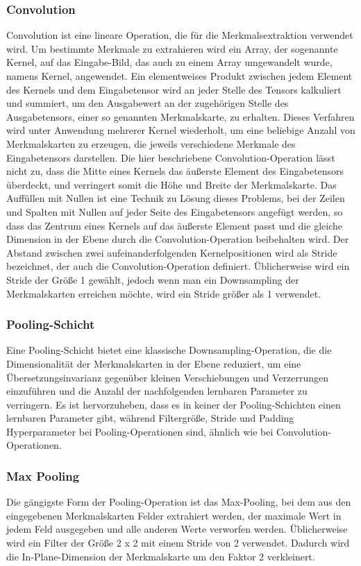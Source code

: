 \documentclass[paper=A4,pagesize=auto,12pt,headinclude=true,footinclude=true,BCOR=0mm,DIV=calc]{scrartcl}
\begin{document}
\subsubsection{Convolution}
Convolution ist eine lineare Operation, die für die Merkmalsextraktion verwendet wird. Um bestimmte Merkmale zu extrahieren wird ein Array, der sogenannte Kernel, auf das Eingabe-Bild, das auch zu einem Array umgewandelt wurde, namens Kernel, angewendet. Ein elementweises Produkt zwischen jedem Element des Kernels und dem Eingabetensor wird an jeder Stelle des Tensors kalkuliert und summiert, um den Ausgabewert an der zugehörigen Stelle des Ausgabetensors, einer so genannten Merkmalskarte, zu erhalten. Dieses Verfahren wird unter Anwendung mehrerer Kernel wiederholt, um eine beliebige Anzahl von Merkmalskarten zu erzeugen, die jeweils verschiedene Merkmale des Eingabetensors darstellen.
Die hier beschriebene Convolution-Operation lässt nicht zu, dass die Mitte eines Kernels das äußerste Element des Eingabetensors überdeckt, und verringert somit die Höhe und Breite der Merkmalskarte. Das Auffüllen mit Nullen ist eine Technik zu Lösung dieses Problems, bei der Zeilen und Spalten mit Nullen auf jeder Seite des Eingabetensors angefügt werden, so dass das Zentrum eines Kernels auf das äußerste Element passt und die gleiche Dimension in der Ebene durch die Convolution-Operation beibehalten wird. Der Abstand zwischen zwei aufeinanderfolgenden Kernelpositionen wird als Stride bezeichnet, der auch die Convolution-Operation definiert. Üblicherweise wird ein Stride der Größe 1 gewählt, jedoch wenn man ein Downsampling  der Merkmalskarten erreichen möchte, wird ein Stride größer als 1 verwendet.

\subsubsection{Pooling-Schicht}
Eine Pooling-Schicht bietet eine klassische Downsampling-Operation, die die Dimensionalität der Merkmalskarten in der Ebene reduziert, um eine Übersetzungsinvarianz gegenüber kleinen Verschiebungen und Verzerrungen einzuführen und die Anzahl der nachfolgenden lernbaren Parameter zu verringern. Es ist hervorzuheben, dass es in keiner der Pooling-Schichten einen lernbaren Parameter gibt, während Filtergröße, Stride und Padding Hyperparameter bei Pooling-Operationen sind, ähnlich wie bei Convolution-Operationen.\cite{cnn2}

\subsubsection{Max Pooling}
Die gängigste Form der Pooling-Operation ist das Max-Pooling, bei dem aus den eingegebenen Merkmalskarten Felder extrahiert werden, der maximale Wert in jedem Feld ausgegeben und alle anderen Werte verworfen werden. Üblicherweise wird ein Filter der Größe 2 x 2 mit einem Stride von 2 verwendet. Dadurch wird die In-Plane-Dimension der Merkmalskarte um den Faktor 2 verkleinert.\cite{cnn2}
\end{document}
